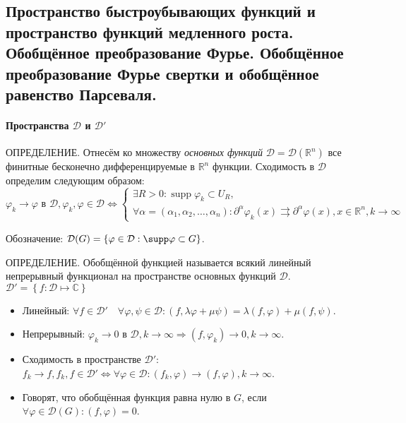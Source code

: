 \subsection{Пространство быстроубывающих функций и пространство функций медленного роста. Обобщённое преобразование Фурье. Обобщённое преобразование Фурье свертки и обобщённое равенство Парсеваля.}

\paragraph{Пространства $\mathcal{D}$ и $\mathcal{D}'$}
ОПРЕДЕЛЕНИЕ. Отнесём ко множеству \emph{основных функций} $\mathcal{D} = \mathcal{D} (\mathbb{R}^n)$ все
финитные бесконечно дифференцируемые в $\mathbb{R}^n$ функции. Сходимость в $\mathcal{D}$
определим следующим образом:
\[
  \varphi_k \to \varphi \text{ в } \mathcal{D}, \varphi_k, \varphi \in \mathcal{D}
  \Leftrightarrow
  \begin{cases}
    \exists R > 0 : \operatorname{supp} \varphi_k \subset U_R, \\
    \forall \alpha=(\alpha_1, \alpha_2, \dots, \alpha_n) :
      \partial^{\alpha} \varphi_k(x) \rightrightarrows \partial^{\alpha} \varphi(x), x\in\mathbb{R}^n, 
      k \to \infty
  \end{cases}
\]

Обозначение: $\mathcal{D} (G) = \left\{ \varphi \in \mathcal{D} : \supp\varphi \subset G \right\}$.

ОПРЕДЕЛЕНИЕ. Обобщённой функцией называется всякий линейный непрерывный функционал на пространстве
основных функций $\mathcal{D}$. $\mathcal{D}' = \left\{ f: \mathcal{D} \mapsto \mathbb{C} \right\} $

\begin{itemize}
  \item Линейный: $\forall f \in \mathcal{D}' \quad \forall \varphi, \psi \in \mathcal{D} : (f, \lambda \varphi + \mu \psi) = \lambda (f, \varphi) + \mu (f, \psi)$.

  \item Непрерывный: $\varphi_k \to 0 \text{ в } \mathcal{D}, k \to \infty \Rightarrow (f, \varphi_k) \to 0, k \to \infty$.

  \item Сходимость в пространстве $\mathcal{D}'$: $f_k \to f, f_k, f \in \mathcal{D}' \Leftrightarrow
\forall \varphi \in \mathcal{D} : (f_k, \varphi) \to (f, \varphi), k \to \infty$.

 \item Говорят, что обобщённая функция равна нулю в $G$, если $\forall \varphi \in \mathcal{D}(G) : (f, \varphi) = 0$. 
\end{itemize}

